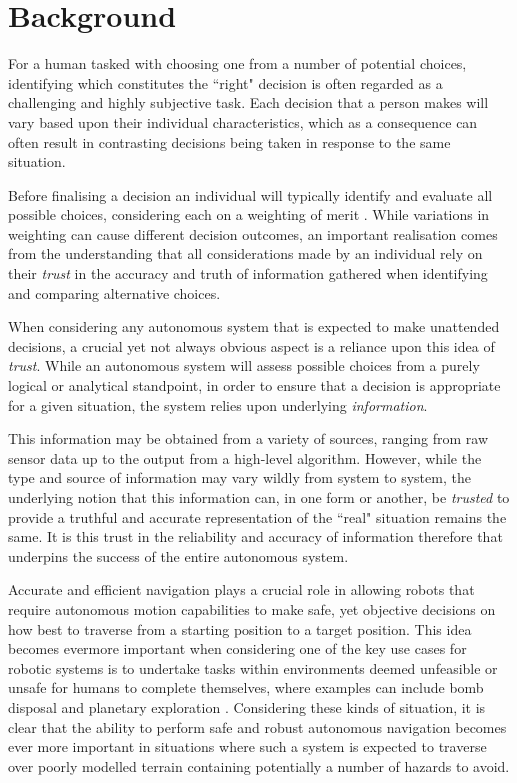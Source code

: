 \section{Background}

For a human tasked with choosing one from a number of potential choices, identifying which constitutes the ``right" decision is often regarded as a challenging and highly subjective task. Each decision that a person makes will vary based upon their individual characteristics, which as a consequence can often result in contrasting decisions being taken in response to the same situation. 

Before finalising a decision an individual will typically identify and evaluate all possible choices, considering each on a weighting of merit \cite{rational-decision-model}. While variations in weighting can cause different decision outcomes, an important realisation comes from the understanding that all considerations made by an individual rely on their \textit{trust} in the accuracy and truth of information gathered when identifying and comparing alternative choices.

 When considering any autonomous system that is expected to make unattended decisions, a crucial yet not always obvious aspect is a reliance upon this idea of \textit{trust}. While an autonomous system will assess possible choices from a purely logical or analytical standpoint, in order to ensure that a decision is appropriate for a given situation, the system relies upon underlying \textit{information}.
 
 This information may be obtained from a variety of sources, ranging from raw sensor data up to the output from a high-level algorithm. However, while the type and source of information may vary wildly from system to system, the underlying notion that this information can, in one form or another, be \textit{trusted} to provide a truthful and accurate representation of the ``real" situation remains the same. It is this trust in the reliability and accuracy of information therefore that underpins the success of the entire autonomous system.
 
  Accurate and efficient navigation plays a crucial role in allowing robots that require autonomous motion capabilities to make safe, yet objective decisions on how best to traverse from a starting position to a target position. This idea becomes evermore important when considering one of the key use cases for robotic systems is to undertake tasks within environments deemed unfeasible or unsafe for humans to complete themselves, where examples can include bomb disposal \cite{bomb-disposal} and planetary exploration \cite{planet-explore}. Considering these kinds of situation, it is clear that the ability to perform safe and robust autonomous navigation becomes ever more important in situations where such a system is expected to traverse over poorly modelled terrain containing potentially a number of hazards to avoid. 

